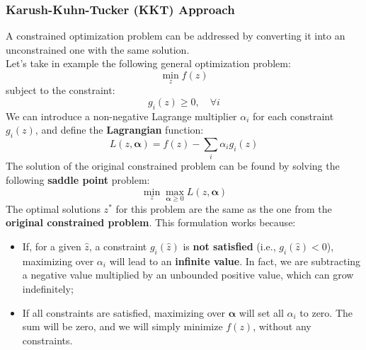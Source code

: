 \subsubsection{Karush-Kuhn-Tucker (KKT) Approach}
A constrained optimization problem can be addressed by converting it into an unconstrained one with the same solution.
\\Let's take in example the following general optimization problem:
\[
    \min_{z} f(z)
\]
subject to the constraint:
\[ g_i(z) \geq 0, \quad \forall i \]
We can introduce a non-negative Lagrange multiplier $\alpha_i$ for each constraint $g_i(z)$, and define the \textbf{Lagrangian} function:
\[ L(z, \boldsymbol{\alpha}) = f(z) - \sum_i \alpha_i g_i(z) \]
The solution of the original constrained problem can be found by solving the following \textbf{saddle point} problem:
\[ \min_{z} \max_{\boldsymbol{\alpha} \geq 0} L(z, \boldsymbol{\alpha}) \]
The optimal solutions $z^*$ for this problem are the same as the one from the \textbf{original constrained problem}.
This formulation works because:
\begin{itemize}
    \item If, for a given $\hat{z}$, a constraint $g_i(\hat{z})$ is \textbf{not satisfied} (i.e., $g_i(\hat{z}) < 0$), maximizing over $\alpha_i$ will lead to an \textbf{infinite value}. In fact, we are subtracting a negative value multiplied by an unbounded positive value, which can grow indefinitely;
    \item If all constraints are satisfied, maximizing over $\boldsymbol{\alpha}$ will set all $\alpha_i$ to zero.
    The sum will be zero, and we will simply minimize $f(z)$, without any constraints.
\end{itemize}

